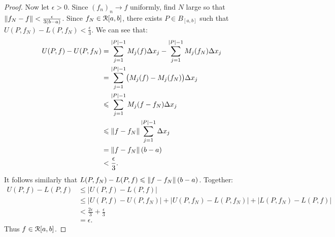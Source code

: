 \documentclass[11pt,twoside,openany]{memoir}
\begin{document}
\begin{proof}
            Now let $\epsilon > 0$. Since $(f_n)_n \rightarrow f$ uniformly, find $N$ large so that $\left\lVert f_N - f \right\rVert < \frac{\epsilon}{3(b-a)}$. Since $f_N \in \mathcal{R}[a,b]$, there exists $P \in B_{[a,b]}$ such that $U(P,f_N) - L(P,f_N) < \frac{\epsilon}{3}$. We can see that:
                \begin{equation*}
                \begin{split}
                    U(P,f) - U(P,f_N)
                    & = \sum_{j = 1}^{|P| - 1}M_j(f)\Delta x_j - \sum_{j = 1}^{|P| - 1}M_j(f_N)\Delta x_j \\
                    & = \sum_{j = 1}^{|P| - 1} \bigl(M_j(f) - M_j(f_N)\bigr)\Delta x_j \\
                    & \leqslant \sum_{j = 1}^{|P| - 1} M_j(f - f_N)\Delta x_j \\
                    & \leqslant \left\lVert f - f_N \right\rVert\sum_{j = 1}^{|P| - 1} \Delta x_j \\
                    & = \left\lVert f - f_N \right\rVert(b-a) \\
                    & < \frac{\epsilon}{3}.
                \end{split}
                \end{equation*}
            It follows similarly that $L(P,f_N) - L(P,f) \leqslant \left\lVert f - f_N \right\rVert(b-a)$. Together:
                \begin{equation*}
                \begin{split}
                    U(P,f) - L(P,f)
                    & \leq |U(P,f) - L(P,f)| \\
                    & \leq |U(P,f) - U(P,f_N)| + |U(P,f_N) - L(P,f_N)| + |L(P,f_N) - L(P,f)| \\
                    & < \frac{2\epsilon}{3} + \frac{\epsilon}{3} \\
                    & = \epsilon.
                \end{split}
                \end{equation*}
            Thus $f \in \mathcal{R}[a,b]$.
        \end{proof}
\end{document}
